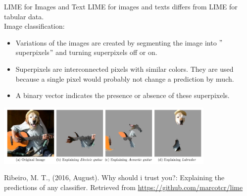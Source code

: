\documentclass[11pt,compress,t,notes=noshow, xcolor=table]{beamer}
\begin{document}
\begin{vbframe}{LIME for Images and Text}
\normalsize
LIME for images and texts differs from LIME for tabular data. \\[0.2cm]
Image classification: 
  \begin{itemize}
  \item Variations of the images are created by segmenting the image into $"$superpixels$"$ and turning superpixels off or on. 
  \item Superpixels are interconnected pixels with similar colors. They are used because a single pixel would probably not change a prediction by much.
  \item A binary vector indicates the presence or absence of these superpixels.
\end{itemize}
\vspace{-0.3cm}
\begin{center}
 \includegraphics[width=0.8\textwidth]{figure/lime-images}
\end{center}
\vspace{-0.3cm}
\tiny{Ribeiro, M. T., (2016, August). Why should i trust you?: Explaining the predictions of any classifier. Retrieved from \url{https://github.com/marcotcr/lime}\par}
\end{vbframe}
\end{document}
